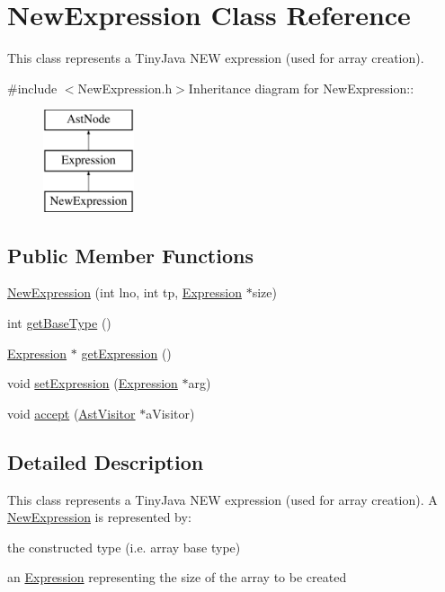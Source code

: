 \hypertarget{classNewExpression}{
\section{NewExpression Class Reference}
\label{classNewExpression}
}


This class represents a TinyJava NEW expression (used for array creation).  


{\ttfamily \#include $<$NewExpression.h$>$}Inheritance diagram for NewExpression::\begin{figure}[H]
\begin{center}
\leavevmode
\includegraphics[height=3cm]{classNewExpression}
\end{center}
\end{figure}
\subsection*{Public Member Functions}
\begin{DoxyCompactItemize}
\item 
\hyperlink{classNewExpression_a19c967d630d86b4ff25b95e589d3a84d}{NewExpression} (int lno, int tp, \hyperlink{classExpression}{Expression} $\ast$size)
\item 
int \hyperlink{classNewExpression_aa26ede4c3685e4cf1846eb62b9051355}{getBaseType} ()
\item 
\hyperlink{classExpression}{Expression} $\ast$ \hyperlink{classNewExpression_a86da8a128d8c401ba775cd997aa634fa}{getExpression} ()
\item 
void \hyperlink{classNewExpression_a187b0a20b76ebd542c84b43880ef9692}{setExpression} (\hyperlink{classExpression}{Expression} $\ast$arg)
\item 
void \hyperlink{classNewExpression_a4b5178e78150432ac58a08197204fa27}{accept} (\hyperlink{classAstVisitor}{AstVisitor} $\ast$aVisitor)
\end{DoxyCompactItemize}


\subsection{Detailed Description}
This class represents a TinyJava NEW expression (used for array creation). A \hyperlink{classNewExpression}{NewExpression} is represented by:
\begin{DoxyItemize}
\item the constructed type (i.e. array base type)
\item an \hyperlink{classExpression}{Expression} representing the size of the array to be created 
\end{DoxyItemize}

